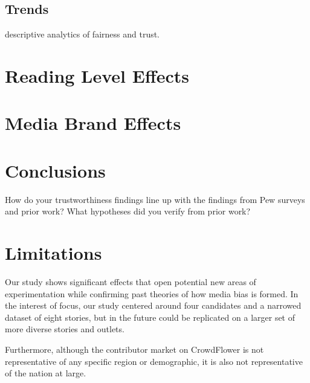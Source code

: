 \newpage
\subsection{Trends}
descriptive analytics of fairness and trust.




 

  


 

\section{Reading Level Effects}


\section{Media Brand Effects}



\section{Conclusions}

How do your trustworthiness findings line up with the findings from Pew surveys and prior work? What hypotheses did you verify from prior work?

\section{Limitations}

Our study shows significant effects that open potential new areas of experimentation while confirming past theories of how media bias is formed. In the interest of focus, our study centered around four candidates and a narrowed dataset of eight stories, but in the future could be replicated on a larger set of more diverse stories and outlets. 

Furthermore, although the contributor market on CrowdFlower is not representative of any specific region or demographic, it is also not representative of the nation at large.
